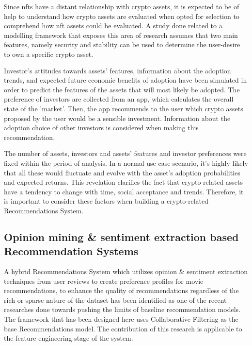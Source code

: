 Since \gls{nft}s have a distant relationship with crypto assets, it is expected to be of help to understand how crypto assets are evaluated when opted for selection to comprehend how \gls{nft} assets could be evaluated. A study done related to a modelling framework that exposes this area of research \autocite{bartolucci_model_2020} assumes that two main features, namely security and stability can be used to determine the user-desire to own a specific crypto asset. 

Investor's attitudes towards assets’ features, information about the adoption trends, and expected future economic benefits of adoption have been simulated in order to predict the features of the assets that will most likely be adopted. The preference of investors are collected from an app, which calculates the overall state of the 'market'. Then, the app recommends to the user which crypto assets proposed by the user would be a sensible investment. Information about the adoption choice of other investors is considered when making this recommendation.

The number of assets, investors and assets' features and investor preferences were fixed within the period of analysis. In a normal use-case scenario, it's highly likely that all these would fluctuate and evolve with the asset's adoption probabilities and expected returns. This revelation clarifies the fact that crypto related assets have a tendency to change with time, social acceptance and trends. Therefore, it is important to consider these factors when building a crypto-related Recommendations System.


\subsection{Opinion mining \& sentiment extraction based Recommendation Systems}

A hybrid Recommendations System \autocite{cheng_hybrid_2020} which utilizes opinion \& sentiment extraction techniques from user reviews to create preference profiles for movie recommendations, to enhance the quality of recommendations regardless of the rich or sparse nature of the dataset has been identified as one of the recent researches done towards pushing the limits of baseline recommendation models. The framework that has been designed here uses Collaborative Filtering as the base Recommendations model. The contribution of this research is applicable to the feature engineering stage of the system.

